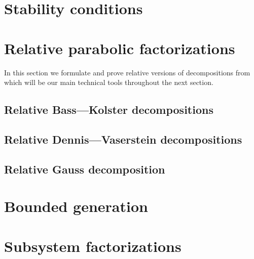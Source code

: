 \documentclass[12pt]{amsart}
\numberwithin{equation}{section}
\theoremstyle{definition}
\begin{document}
\section{Stability conditions}\label{sec:stability-conditions}


\section{Relative parabolic factorizations} \label{sec:factorizations}
In this section we formulate and prove relative versions of decompositions from~\cite{St78} which will be our main technical tools throughout the next section.

\subsection{Relative Bass---Kolster decompositions}\label{sec:bass-kolster}

\subsection{Relative Dennis---Vaserstein decompositions}\label{sec:dennis-vaserstein}

\subsection{Relative Gauss decomposition}\label{sec:gauss}


\section{Bounded generation}\label{sec:boundgen}

\section{Subsystem factorizations}\label{sec:subsysfact}


\printbibliography
\end{document}
